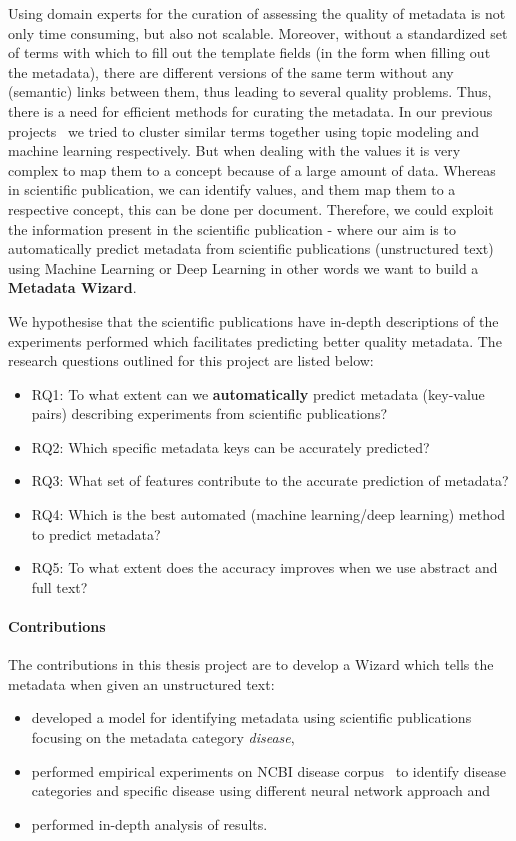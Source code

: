 Using domain experts for the curation of assessing the quality of metadata is not only time consuming, but also not scalable. 
Moreover, without a standardized set of terms with which to fill out the template fields (in the form when filling out the metadata), there are different versions of the same term without any (semantic) links between them, thus leading to several quality problems. Thus, there is a need for  efficient methods for curating the metadata. In our previous projects~\cite{nayak2018quality, nayak2018ML} we tried to cluster similar terms together using topic modeling and machine learning respectively. But when dealing with the values it is very complex to map them to a concept because of a large amount of data. Whereas in scientific publication, we can identify values, and them map them to a respective concept, this can be done per document. Therefore, we could exploit the information present in the scientific publication - where our aim is to automatically predict metadata from scientific publications (unstructured text) using Machine Learning or Deep Learning in other words we want to build a \textbf{Metadata Wizard}.

We hypothesise that the scientific publications have in-depth descriptions of the experiments performed which facilitates predicting better quality metadata. 
The research questions outlined for this project are listed below:
\begin{itemize}
    \item RQ1: To what extent can we \textbf{automatically} predict metadata (key-value pairs) describing experiments from scientific publications?%
    \item RQ2: Which specific metadata keys can be accurately predicted?
    \item RQ3: What set of features contribute to the accurate prediction of metadata?
    \item RQ4: Which is the best automated (machine learning/deep learning) method to predict metadata?
    \item RQ5: To what extent does the accuracy improves when we use abstract and full text?
\end{itemize}

\paragraph{Contributions} 
The contributions in this thesis project are to develop a Wizard which tells the metadata when given an unstructured text:
\begin{itemize}
\item  developed a model for identifying metadata using scientific publications focusing on the metadata category \emph{disease}, 
\item  performed empirical experiments on NCBI disease corpus~\cite{dougan2014ncbi} to identify disease categories and specific disease using different neural network approach and \item performed in-depth analysis of results. 
\end{itemize}

